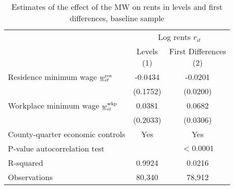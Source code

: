 \begin{table}[hbt!] \centering
    \caption{Estimates of the effect of the MW on rents in levels and first differences,
             baseline sample}
    \label{tab:autocorrelation}
    \begin{tabular}{@{}lcc@{}}
        \toprule
            & \multicolumn{2}{c}{Log rents $r_{it}$}                    \\ \cmidrule(l){2-3} 
            & \shortstack{Levels\\(1)} 
            & \shortstack{First Differences\\(2)}                       \\ \midrule
        Residence minimum wage $\underline{w}^{\text{res}}_{it}$    &  -0.0434   &  -0.0201              \\
                                                    & (0.1752)  & (0.0200)             \\
        Workplace minimum wage $\underline{w}^{\text{wkp}}_{it}$    &  0.0381   &  0.0682              \\
                                                    & (0.2033)  & (0.0306)             \\ \midrule
        County-quarter economic controls            &  Yes   &  Yes              \\
        P-value autocorrelation test                &        &  $<0.0001$        \\
        R-squared                                   &  0.9924   &  0.0216              \\
        Observations                                &  80,340  &  78,912             \\ \bottomrule
    \end{tabular}


\end{table}
